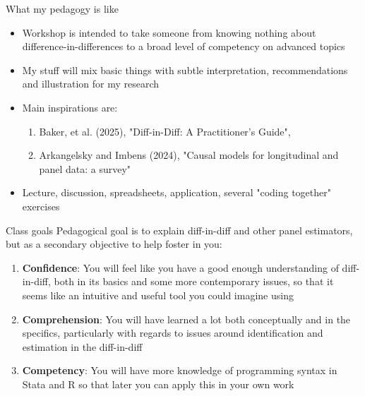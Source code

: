 \documentclass{beamer}
\begin{document}
\begin{frame}{What my pedagogy is like}

\begin{itemize}
\item Workshop is intended to take someone from knowing nothing about difference-in-differences to a broad level of competency on advanced topics
\item My stuff will mix basic things with subtle interpretation, recommendations and illustration for my research
\item Main inspirations are:
	\begin{enumerate}
	\item Baker, et al. (2025), "Diff-in-Diff:  A Practitioner's Guide", 
	\item  Arkangelsky and Imbens (2024), "Causal models for longitudinal and panel data: a survey"
	\end{enumerate}
\item Lecture, discussion, spreadsheets, application, several "coding together" exercises
\end{itemize}
\end{frame}


\begin{frame}{Class goals}
Pedagogical goal is to explain diff-in-diff and other panel estimators, but as a secondary objective to help foster in you:

  \begin{enumerate}
    \item \textbf{Confidence}: You will feel like you have a good enough understanding of diff-in-diff, both in its basics and some more contemporary issues, so that it seems like an intuitive and useful tool you could imagine using
    \item \textbf{Comprehension}: You will have learned a lot both conceptually and in the specifics, particularly with regards to issues around identification and estimation in the diff-in-diff
    \item \textbf{Competency}: You will have more knowledge of programming syntax in Stata and R so that later you can apply this in your own work
  \end{enumerate}

\end{frame}
\end{document}
